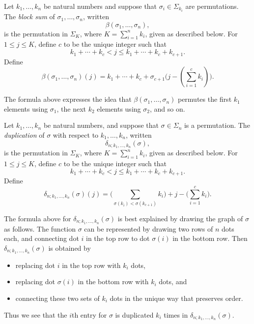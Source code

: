 \begin{Defi}\label{Defi:beta-s}
Let $k_1, \ldots, k_n$ be natural numbers and suppose that $\sigma_i \in \Sigma_{k_i}$ are permutations. The \emph{block sum} of $\sigma_1, \ldots, \sigma_n$, written 
\[
\beta( \sigma_1, \ldots, \sigma_n ),
\]
is the permutation in $\Sigma_K$, where $K = \sum_{i=1}^n k_i$, given as described below. 
For $1 \leq j \leq K$, define $c$ to be the unique integer such that
\[
k_1 + \cdots + k_c < j \leq k_1 + \cdots + k_c +k_{c+1}.
\]
Define
\[
\beta( \sigma_1, \ldots, \sigma_n )(j) = k_1 + \cdots + k_c + \sigma_{c+1}\big( j - (\sum_{i=1}^c k_i) \big).
\]
\end{Defi}

\begin{rem}\label{rem:beta-s}
The formula above expresses the idea that $\beta( \sigma_1, \ldots, \sigma_n )$ permutes the first $k_1$ elements using $\sigma_1$, the next $k_2$ elements using $\sigma_2$, and so on.
\end{rem}

\begin{Defi}[(Duplication)]\label{Defi:delta-s}
Let $k_1, \ldots, k_n$ be natural numbers, and suppose that $\sigma \in \Sigma_n$ is a permutation. The \emph{duplication} of $\sigma$ with respect to $k_1, \ldots, k_n$, written
\[
\delta_{n; k_1, \ldots, k_n}(\sigma),
\]
is the permutation in $\Sigma_K$, where $K = \sum_{i=1}^n k_i$, given as described below. 
For $1 \leq j \leq K$, define $c$ to be the unique integer such that
\[
k_1 + \cdots + k_c < j \leq k_1 + \cdots + k_c +k_{c+1}.
\]
Define
\[
\delta_{n; k_1, \ldots, k_n}(\sigma)(j) = \big( \sum_{\sigma(k_i) < \sigma(k_{c+1})} k_i\big) + j - \big( \sum_{i=1}^c k_i \big).
\]
\end{Defi}

\begin{rem}\label{rem:delta-s}
The formula above for $\delta_{n; k_1, \ldots, k_n}(\sigma)$ is best explained by drawing the graph of $\sigma$ as follows. The function $\sigma$ can be represented by drawing two rows of $n$ dots each, and connecting dot $i$ in the top row to dot $\sigma(i)$ in the bottom row. Then $\delta_{n; k_1, \ldots, k_n}(\sigma)$ is obtained by 
\begin{itemize}
\item replacing dot $i$ in the top row with $k_i$ dots,
\item replacing dot $\sigma(i)$ in the bottom row with $k_i$ dots, and
\item connecting these two sets of $k_i$ dots in the unique way that preserves order.
\end{itemize}
Thus we see that the $i$th entry for $\sigma$ is duplicated $k_i$ times in $\delta_{n; k_1, \ldots, k_n}(\sigma)$.
\end{rem}

